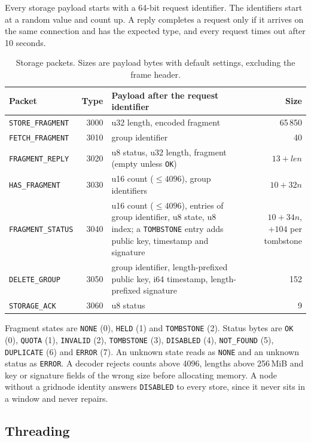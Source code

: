 \documentclass[10pt,a4paper,final]{article}
\newcommand{\code}[1]{\texttt{#1}}
\begin{document}
Every storage payload starts with a 64-bit request identifier. The identifiers start at a random value and count up.
A reply completes a request only if it arrives on the same connection and has the expected type, and every request
times out after 10 seconds.

\begin{table}[H]
\centering
\small
\begin{tabularx}{\linewidth}{@{}lrLr@{}}
\toprule
Packet & Type & Payload after the request identifier & Size \\
\midrule
\code{STORE\_FRAGMENT} & 3000 & u32 length, encoded fragment & 65\,850 \\
\code{FETCH\_FRAGMENT} & 3010 & group identifier & 40 \\
\code{FRAGMENT\_REPLY} & 3020 & u8 status, u32 length, fragment (empty unless \code{OK}) & $13 + \mathit{len}$ \\
\code{HAS\_FRAGMENT} & 3030 & u16 count ($\le 4096$), group identifiers & $10 + 32n$ \\
\code{FRAGMENT\_STATUS} & 3040 & u16 count ($\le 4096$), entries of group identifier, u8 state, u8 index; a
\code{TOMBSTONE} entry adds public key, timestamp and signature & $10 + 34n$, $+104$ per tombstone \\
\code{DELETE\_GROUP} & 3050 & group identifier, length-prefixed public key, i64 timestamp, length-prefixed
signature & 152 \\
\code{STORAGE\_ACK} & 3060 & u8 status & 9 \\
\bottomrule
\end{tabularx}
\caption{Storage packets. Sizes are payload bytes with default settings, excluding the frame header.}
\end{table}

Fragment states are \code{NONE} (0), \code{HELD} (1) and \code{TOMBSTONE} (2). Status bytes are \code{OK} (0),
\code{QUOTA} (1), \code{INVALID} (2), \code{TOMBSTONE} (3), \code{DISABLED} (4), \code{NOT\_FOUND} (5),
\code{DUPLICATE} (6) and \code{ERROR} (7). An unknown state reads as \code{NONE} and an unknown status as
\code{ERROR}. A decoder rejects counts above 4096, lengths above 256\,MiB and key or signature fields of the wrong
size before allocating memory. A node without a gridnode identity answers \code{DISABLED} to every store, since it
never sits in a window and never repairs.

\subsection{Threading}
\end{document}

